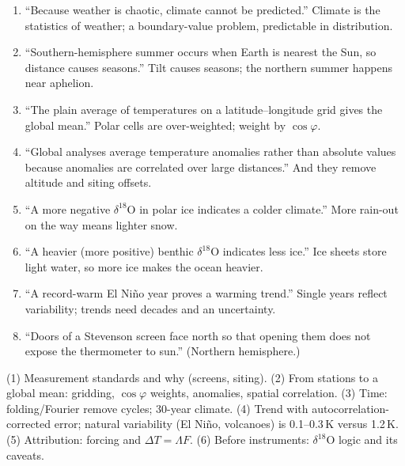 \begin{statements}
\begin{enumerate}[label=\arabic*.]
\item ``Because weather is chaotic, climate cannot be predicted.''
\F Climate is the statistics of weather; a boundary-value problem, predictable in distribution.
\item ``Southern-hemisphere summer occurs when Earth is nearest the Sun, so distance causes seasons.''
\F Tilt causes seasons; the northern summer happens near aphelion.
\item ``The plain average of temperatures on a latitude--longitude grid gives the global mean.''
\F Polar cells are over-weighted; weight by $\cos\varphi$.
\item ``Global analyses average temperature anomalies rather than absolute values because anomalies are correlated over large distances.''
\T And they remove altitude and siting offsets.
\item ``A more negative $\delta^{18}$O in polar ice indicates a colder climate.''
\T More rain-out on the way means lighter snow.
\item ``A heavier (more positive) benthic $\delta^{18}$O indicates less ice.''
\F Ice sheets store light water, so more ice makes the ocean heavier.
\item ``A record-warm El Niño year proves a warming trend.''
\F Single years reflect variability; trends need decades and an uncertainty.
\item ``Doors of a Stevenson screen face north so that opening them does not expose the thermometer to sun.''
\T (Northern hemisphere.)
\end{enumerate}
\end{statements}

\begin{longans}
(1) Measurement standards and why (screens, siting). (2) From stations to a global mean: gridding, $\cos\varphi$ weights,
anomalies, spatial correlation. (3) Time: folding/Fourier remove cycles; 30-year climate. (4) Trend with autocorrelation-corrected
error; natural variability (El Niño, volcanoes) is 0.1--0.3\,K versus 1.2\,K. (5) Attribution: forcing and $\Delta T=\Lambda F$.
(6) Before instruments: $\delta^{18}$O logic and its caveats.
\end{longans}
